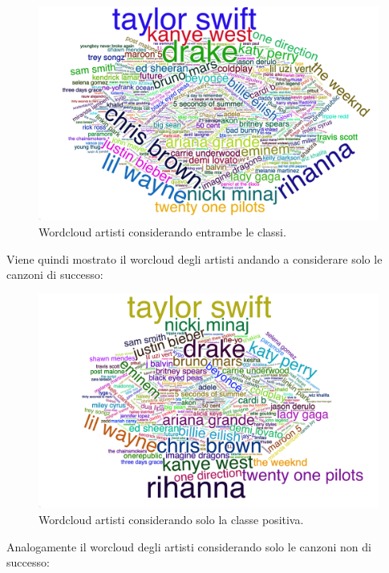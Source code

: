 \begin{figure}[H]
	\centering
	\includegraphics[width=14cm]{../images/wordcloud_overall_fix.png}
	\caption{Wordcloud artisti considerando entrambe le classi.}
\end{figure}

Viene quindi mostrato il worcloud degli artisti andando a considerare solo le canzoni di successo:

\begin{figure}[H]
	\centering
	\includegraphics[width=14cm]{../images/wordcloud_positive_fix.png}
	\caption{Wordcloud artisti considerando solo la classe positiva.}
\end{figure}

Analogamente il worcloud degli artisti considerando solo le canzoni non di successo:

